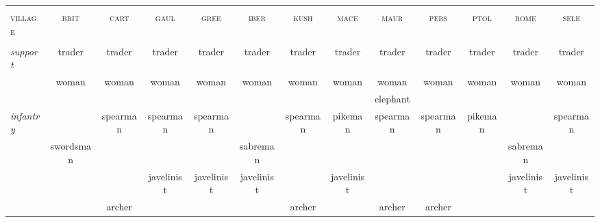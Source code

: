 \documentclass{article}
\newcommand{\brit}{\textsc{\color{blue} brit}}
\newcommand{\cart}{\textsc{\color{blue} cart}}
\newcommand{\gaul}{\textsc{\color{blue} gaul}}
\newcommand{\gree}{\textsc{\color{blue} gree}}
\newcommand{\iber}{\textsc{\color{blue} iber}}
\newcommand{\kush}{\textsc{\color{blue} kush}}
\newcommand{\mace}{\textsc{\color{blue} mace}}
\newcommand{\maur}{\textsc{\color{blue} maur}}
\newcommand{\pers}{\textsc{\color{blue} pers}}
\newcommand{\ptol}{\textsc{\color{blue} ptol}}
\newcommand{\rome}{\textsc{\color{blue} rome}}
\newcommand{\sele}{\textsc{\color{blue} sele}}
\newcommand{\village}{\textsc{\color{blue} village}}
\begin{document}
\begin{landscape}
\footnotesize

\begin{tabular}{l||c|c|c|c||c|c|c|c||c|c|c|c}
\hline
\hline
 &                &                &                &                &                &                &                &                &                &                &                &                \\
\village %
 & \brit          & \cart          & \gaul          & \gree          & \iber          & \kush          & \mace          & \maur          & \pers          & \ptol          & \rome          & \sele          \\
 &                &                &                &                &                &                &                &                &                &                &                &                \\
\hline
\hline\textit{support}
 & trader         & trader         & trader         & trader         & trader         & trader         & trader         & trader         & trader         & trader         & trader         & trader         \\
 & woman          & woman          & woman          & woman          & woman          & woman          & woman          & woman          & woman          & woman          & woman          & woman          \\
 &                &                &                &                &                &                &                & elephant       &                &                &                &                \\
\hline\textit{infantry}
 &                & spearman       & spearman       & spearman       &                & spearman       & pikeman        & spearman       & spearman       & pikeman        &                & spearman       \\
 & swordsman      &                &                &                & sabreman       &                &                &                &                &                & sabreman       &                \\
 &                &                & javelinist     & javelinist     & javelinist     &                & javelinist     &                &                &                & javelinist     & javelinist     \\
 &                & archer         &                &                &                & archer         &                & archer         & archer         &                &                &                \\

\end{tabular}
\end{landscape}
\end{document}
